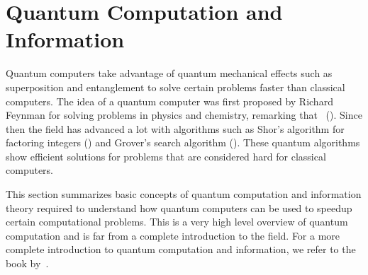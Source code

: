 \documentclass[a4paper,10pt]{article}
\begin{document}
\section{Quantum Computation and Information} \label{sec:quantum-computation-information}
Quantum computers take advantage of quantum mechanical effects such as superposition and entanglement to solve certain problems faster than classical computers.
The idea of a quantum computer was first proposed by Richard Feynman for solving problems in physics and chemistry, remarking that ~(\cite{feynman-simulating}).
Since then the field has advanced a lot with algorithms such as Shor's algorithm for factoring integers (\cite{shor-factoring}) and Grover's search algorithm (\cite{grover-search}).
These quantum algorithms show efficient solutions for problems that are considered hard for classical computers.

This section summarizes basic concepts of quantum computation and information theory required to understand how quantum computers can be used to speedup certain computational problems.
This is a very high level overview of quantum computation and is far from a complete introduction to the field.
For a more complete introduction to quantum computation and information, we refer to the book by~\cite{nielsen-chuang}.
\end{document}

